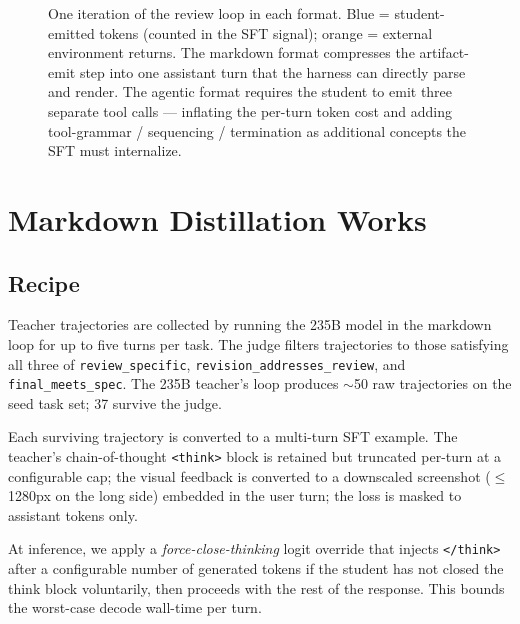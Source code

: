 \documentclass[11pt]{article}
\begin{document}
\begin{figure}[t]
\caption{One iteration of the review loop in each format. Blue = student-emitted tokens (counted in the SFT signal); orange = external environment returns. The markdown format compresses the artifact-emit step into one assistant turn that the harness can directly parse and render. The agentic format requires the student to emit three separate tool calls --- inflating the per-turn token cost and adding tool-grammar / sequencing / termination as additional concepts the SFT must internalize.}
\label{fig:formats}
\end{figure}

\section{Markdown Distillation Works}
\label{sec:markdown}

\subsection{Recipe}

Teacher trajectories are collected by running the 235B model in the markdown loop for up to five turns per task. The judge filters trajectories to those satisfying all three of \texttt{review\_specific}, \texttt{revision\_addresses\_review}, and \texttt{final\_meets\_spec}. The 235B teacher's loop produces $\sim$50 raw trajectories on the seed task set; 37 survive the judge.

Each surviving trajectory is converted to a multi-turn SFT example. The teacher's chain-of-thought \texttt{<think>} block is retained but truncated per-turn at a configurable cap; the visual feedback is converted to a downscaled screenshot ($\le$1280px on the long side) embedded in the user turn; the loss is masked to assistant tokens only.

At inference, we apply a \emph{force-close-thinking} logit override that injects \texttt{</think>} after a configurable number of generated tokens if the student has not closed the think block voluntarily, then proceeds with the rest of the response. This bounds the worst-case decode wall-time per turn.
\end{document}
